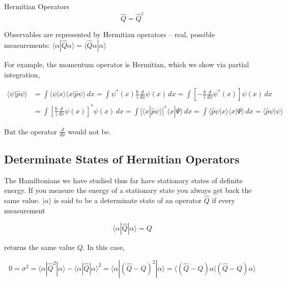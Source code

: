 \begin{subbox}{Hermitian Operators}
  \[ \hat{Q} = \hat{Q}^\dagger \] \vspace{3px} 

  Observables are represented by Hermitian operators -- real, possible
  measurements: $\langle \alpha | \hat{Q} \alpha \rangle = \langle \hat{Q}
  \alpha | \alpha \rangle$
\end{subbox}


For example, the momentum operator is Hermitian, which we show via partial
integration, 

\begin{align} \label{}
  \langle \psi | \hat{p}\psi \rangle &= \int \langle \psi|x \rangle \langle
  x | \hat{p}\psi \rangle \, dx = \int \psi^*(x) \frac{\hbar}{i} \frac{d }{d x}
  \psi(x) \, dx = \int \left[ -\frac{\hbar}{i} \frac{d }{d x} \psi^*(x) \right]
  \psi(x)\, dx \\ 
                                     & = \int \left[\frac{\hbar}{i} \frac{d }{d
                                     x} \psi(x) \right]^*\psi(x) \, dx = \int
                                     [\langle x | \hat{p} \psi \rangle ]^*
                                     \langle x|\Psi \rangle \, dx = \int
                                     \langle \hat{p} \psi | x \rangle
                                     \langle x | \Psi\rangle \, dx = \langle
                                     \hat{p}\psi | \psi \rangle
\end{align}\vspace{3px}

But the operator $ \frac{d }{d x} $ would not be. 




\subsection{Determinate States of Hermitian Operators} 

The Hamiltonians we have studied thus far have stationary states of definite
energy. If you measure the energy of a stationary state you always get back the
same value. $|\alpha\rangle$ is said to be a determinate state of an operator
$\hat{Q}$ if every measurement 

\[
\langle \alpha | \hat{Q} | \alpha \rangle  = Q
\] \vspace{3px}

returns the same value $Q$. In this case, 

\[
0 = \sigma^2 = \langle \alpha | \hat{Q}^2 | \alpha \rangle - \langle \alpha
  | \hat{Q} | \alpha \rangle ^2 = \langle \alpha | (\hat{Q} - Q)^2 | \alpha
  \rangle = \langle (\hat{Q} - Q)\alpha | (\hat{Q} - Q)\alpha \rangle  
\] \vspace{3px}

